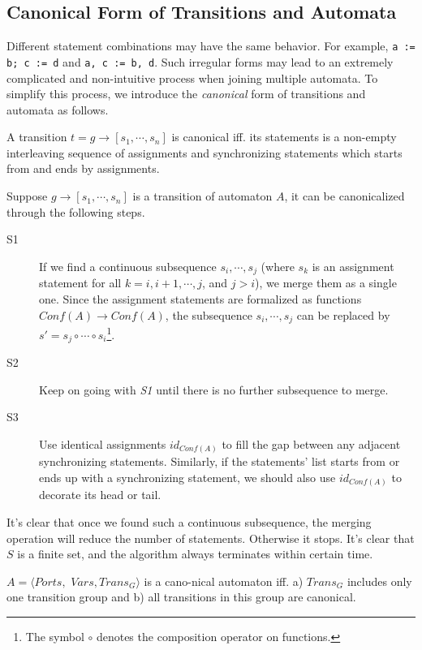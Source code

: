 \subsection{Canonical Form of Transitions and Automata}
\label{subsec:canonical}

Different statement combinations may have the same behavior. For example, \texttt{a := b; c := d} and \texttt{a, c := b, d}. Such irregular forms may lead to an extremely complicated and non-intuitive process when joining multiple automata. 
To simplify this process, we introduce the \emph{canonical} form of transitions and automata as follows.

\begin{definition}
A transition $t=g\rightarrow[s_1,\cdots,s_n]$ is canonical iff. its statements is a non-empty interleaving sequence of assignments and synchronizing statements which starts from and ends by assignments.
\end{definition}

Suppose $g\rightarrow[s_1,\cdots,s_n]$ is a transition of automaton $A$, it can be canonicalized through the following steps.
\begin{description}
    \item[S1] If we find a continuous subsequence $s_i,\cdots,s_j$ (where $s_k$ is an assignment statement for all $k= i,i+1,\cdots,j$, and $j>i$), we merge them as a single one. Since the assignment statements are formalized as functions $Conf(A)\rightarrow Conf(A)$, the subsequence $s_i,\cdots, s_j$ can be replaced by $s'=s_j\circ\cdots \circ s_i$\footnote{The symbol $\circ$ denotes the composition operator on functions.}.
    \item[S2] Keep on going with \emph{S1} until there is no further subsequence to merge.
    \item[S3] Use identical assignments $id_{Conf(A)}$ to fill the gap between any adjacent synchronizing statements. Similarly, if the statements' list starts from or ends up with a synchronizing statement, we should also use $id_{Conf(A)}$ to decorate its head or tail.
\end{description}

It's clear that once we found such a continuous subsequence, the merging operation will reduce the number of statements. Otherwise it stops. It's clear that $S$ is a finite set, and the algorithm always terminates within certain time.

\begin{definition}
    $A=\langle Ports,$ $Vars,Trans_G\rangle$ is a cano-nical automaton iff. a) $Trans_G$ includes only one transition group and b) all transitions in this group are canonical.
\end{definition}

